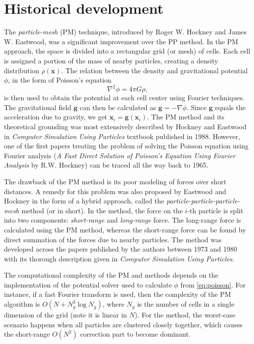 \section{Historical development}\label{sec:historical-development}
The \textit{particle-mesh} (PM) technique, introduced by Roger W. Hockney and James W. Eastwood, was a significant improvement over the PP method.
In the PM approach, the space is divided into a rectangular grid (or mesh) of cells.
Each cell is assigned a portion of the mass of nearby particles, creating a density distribution $\rho(\mathbf{x})$.
The relation between the density and gravitational potential $\phi$, in the form of Poisson's equation
\begin{equation}\label{eq:poisson}
    \nabla^2\phi = 4\pi G \rho,
\end{equation}
is then used to obtain the potential at each cell center using Fourier techniques.
The gravitational field $\mathbf{g}$ can then be calculated as $\mathbf{g} = -\nabla \phi$.
Since $\mathbf{g}$ equals the acceleration due to gravity, we get $\ddot{\mathbf{x}}_i = \mathbf{g}(\mathbf{x}_i)$.
The PM method and its theoretical grounding was most extensively described by Hockney and Eastwood in \textit{Computer Simulation Using Particles} textbook published in 1988.
However, one of the first papers treating the problem of solving the Poisson equation using Fourier analysis (\textit{A Fast Direct Solution of Poisson's Equation Using Fourier Analysis} by R.W. Hockney) can be traced all the way back to 1965.

The drawback of the PM method is its poor modeling of forces over short distances.
A remedy for this problem was also proposed by Eastwood and Hockney in the form of a hybrid approach, called the \textit{particle-particle-particle-mesh} method (or \PThreeM{} in short).
In the \PThreeM{} method, the force on the $i$-th particle is split into two components: \textit{short-range} and \textit{long-range} force.
The long-range force is calculated using the PM method, whereas the short-range force can be found by direct summation of the forces due to nearby particles.
The \PThreeM{} method was developed across the papers published by the authors between 1973 and 1980 with its thorough description given in \textit{Computer Simulation Using Particles}.

The computational complexity of the PM and \PThreeM{} methods depends on the implementation of the potential solver used to calculate $\phi$ from \autoref{eq:poisson}.
For instance, if a fast Fourier transform is used, then the complexity of the PM algorithm is $O(N + N_g^3\log N_g)$, where $N_g$ is the number of cells in a single dimension of the grid (note it is linear in $N$).
For the \PThreeM{} method, the worst-case scenario happens when all particles are clustered closely together, which causes the short-range $O(N^2)$ correction part to become dominant.

